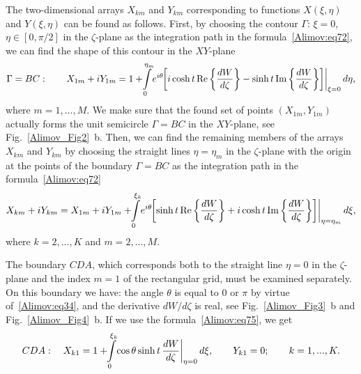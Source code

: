 \documentclass[
11pt,%
tightenlines,%
twoside,%
onecolumn,%
nofloats,%
nobibnotes,%
nofootinbib,%
superscriptaddress,%
noshowpacs,%
centertags]%
{revtex4-2}
\begin{document}
The two-dimensional arrays $X_{km}$ and $Y_{km}$ corresponding to functions $X(\xi, \eta)$ and
$Y(\xi, \eta)$ can be found as follows. First, by choosing the contour $\Gamma$: $\xi = 0$, $\eta
\in [0,\pi / 2]$ in the $\zeta$-plane as the integration path in the formula~\eqref{Alimov:eq72},
we can find the shape of this contour in the $XY$-plane
\begin{equation}
\label{Alimov:eq74} \Gamma = BC: \quad \quad X_{1m} + iY_{1m} = 1 +
\hspace{-1mm}\int\limits_0^{\eta_m} {\left. \hspace{-1mm}{e^{i\theta}\hspace{-1mm}\left[ {i\cosh t
\,\mbox{Re} \left\{ {\frac{dW}{d\zeta}} \right\} - \sinh t \,\mbox{Im} \left\{ {\frac{dW}{d\zeta }}
\right\}} \right]} \right|_{\xi = 0} d\eta, }
\end{equation}
where $ m = 1,...,M$. We make sure that the found set of points $(X_{1m},Y_{1m})$
actually forms the unit semicircle $\Gamma = BC$ in the $XY$-plane, see Fig.~\ref{Alimov_Fig2}~b.
Then, we can find the remaining members of the arrays $X_{km}$ and $Y_{km}$ by choosing the straight
lines $\eta = \eta_m $ in the $\zeta$-plane with the origin at the points of the boundary $\Gamma =
BC$ as the integration path in the formula~\eqref{Alimov:eq72}
\begin{equation}
\label{Alimov:eq75} X_{km} + iY_{km} = X_{1m} + iY_{1m} + \hspace{-1mm}\int\limits_0^{\xi_k }
{\left. \hspace{-1mm}{e^{i\theta}\hspace{-1mm}\left[ {\sinh t\,\mbox{Re}\left\{ {\frac{dW}{d\zeta
}} \right\} + i\cosh t\,\mbox{Im}\left\{ {\frac{dW}{d\zeta }} \right\}} \right]} \right|_{\eta =
\eta_m } d\xi},
\end{equation}
where $k = 2,...,K$ and $m = 2,...,M$.

The boundary $CDA$, which corresponds both to the straight line $\eta = 0$ in the $\zeta$-plane and
the index $m = 1$ of the rectangular grid, must be examined separately. On this boundary we have:
the angle $\theta$ is equal to $0$ or $\pi$ by virtue of~\eqref{Alimov:eq34}, and the derivative
${dW}/{d\zeta}$ is real, see Fig.~\ref{Alimov_Fig3}~b and Fig.~\ref{Alimov_Fig4}~b. If we use the
formula~\eqref{Alimov:eq75}, we get
\begin{equation}
\label{Alimov:eq76} CDA: \quad X_{k1} = 1 + \hspace{-1mm}\int\limits_0^{\xi_k } \hspace{-1mm}
{\left. {\cos \theta \sinh t\, \frac{dW}{d\zeta }} \right|_{\eta = 0} d\xi }, \quad \quad Y_{k1} =
0; \quad \quad k = 1,...,K.
\end{equation}
\end{document}
